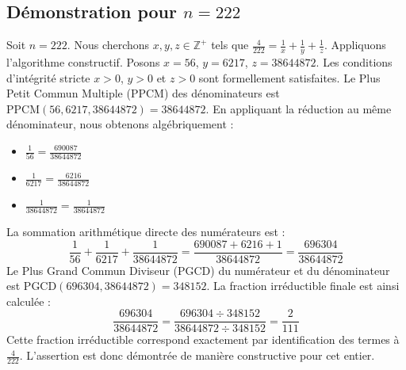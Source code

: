 \documentclass[11pt,a4paper]{article}
\begin{document}
\subsection{Démonstration pour $n = 222$}
Soit $n = 222$. Nous cherchons $x, y, z \in \mathbb{Z}^{+}$ tels que $\frac{4}{222} = \frac{1}{x} + \frac{1}{y} + \frac{1}{z}$.
Appliquons l'algorithme constructif. Posons $x = 56$, $y = 6217$, $z = 38644872$.
Les conditions d'intégrité stricte $x > 0$, $y > 0$ et $z > 0$ sont formellement satisfaites.
Le Plus Petit Commun Multiple (PPCM) des dénominateurs est $\text{PPCM}(56, 6217, 38644872) = 38644872$.
En appliquant la réduction au même dénominateur, nous obtenons algébriquement :
\begin{itemize}
    \item $\frac{1}{56} = \frac{690087}{38644872}$
    \item $\frac{1}{6217} = \frac{6216}{38644872}$
    \item $\frac{1}{38644872} = \frac{1}{38644872}$
\end{itemize}
La sommation arithmétique directe des numérateurs est :
$$ \frac{1}{56} + \frac{1}{6217} + \frac{1}{38644872} = \frac{690087 + 6216 + 1}{38644872} = \frac{696304}{38644872} $$
Le Plus Grand Commun Diviseur (PGCD) du numérateur et du dénominateur est $\text{PGCD}(696304, 38644872) = 348152$.
La fraction irréductible finale est ainsi calculée :
$$ \frac{696304}{38644872} = \frac{696304 \div 348152}{38644872 \div 348152} = \frac{2}{111} $$
Cette fraction irréductible correspond exactement par identification des termes à $\frac{4}{222}$. L'assertion est donc démontrée de manière constructive pour cet entier.
\end{document}
